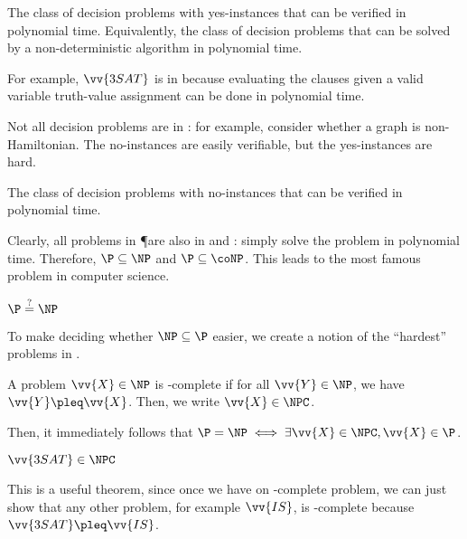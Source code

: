 \begin{defn}[\NP]
  The class of decision problems with yes-instances
  that can be verified in polynomial time.
  Equivalently, the class of decision problems that can be solved
  by a non-deterministic algorithm in polynomial time.
\end{defn}

For example, $\vv{3SAT}$ is in \NP because evaluating the clauses
given a valid variable truth-value assignment can be done in polynomial time.

Not all decision problems are in \NP:
for example, consider whether a graph is non-Hamiltonian.
The no-instances are easily verifiable, but the yes-instances are hard.

\begin{defn}[\coNP]
  The class of decision problems with no-instances
  that can be verified in polynomial time.
\end{defn}

Clearly, all problems in \P are also in \NP and \coNP:
simply solve the problem in polynomial time.
Therefore, $\P \subseteq \NP$ and $\P \subseteq \coNP$.
This leads to the most famous problem in computer science.

\begin{conjecture}
  $\P \stackrel{?}{=} \NP$
\end{conjecture}

To make deciding whether $\NP \subseteq \P$ easier,
we create a notion of the ``hardest'' problems in \NP.

\begin{defn}[\NP-complete]
  A problem $\vv{X} \in \NP$ is \NP-complete if for all $\vv{Y} \in \NP$,
  we have $\vv{Y} \pleq \vv{X}$.
  Then, we write $\vv{X} \in \NPC$.
\end{defn}

Then, it immediately follows that $\P = \NP \iff \exists\vv{X} \in \NPC, \vv{X} \in \P$.

\begin{theorem}
  $\vv{3SAT} \in \NPC$
\end{theorem}

This is a useful theorem, since once we have on \NP-complete problem,
we can just show that any other problem, for example $\vv{IS}$,
is \NP-complete because $\vv{3SAT} \pleq \vv{IS}$.

